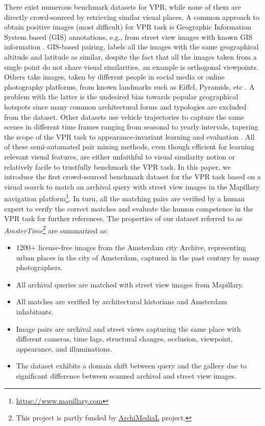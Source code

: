 \documentclass[a4paper,conference]{IEEEtran}
\begin{document}
There exist numerous benchmark datasets for VPR, while none of them are directly crowd-sourced by retrieving similar visual places. A common approach to obtain positive images (most difficult) for VPR task is Geographic Information System based (GIS) annotations, e.g., from street view images with known GIS information \cite{arandjelovic2016netvlad}. GIS-based pairing, labels all the images with the same geographical altitude and latitude as similar, despite the fact that all the images taken from a single point do not share visual similarities, an example is orthogonal viewpoints. Others take images, taken by different people in social media or online photography platforms, from known landmarks such as Eiffel, Pyramids, etc \cite{gordo2016deep,weyand2020google}. A problem with the latter is the undesired bias towards popular geographical hotspots since many common architectural forms and typologies are excluded from the dataset. Other datasets use vehicle trajectories to capture the same scenes in different time frames ranging from seasonal to yearly intervals, tapering the scope of the VPR task to appearance-invariant learning and evaluation \cite{olid2018single,Chen2017}.  All of these semi-automated pair mining methods, even though efficient for learning relevant visual features, are either unfaithful to visual similarity notion or relatively facile to trustfully benchmark the VPR task.  In this paper, we introduce the first crowd-sourced benchmark dataset for the VPR task based on a visual search to match an archival query with street view images in the Mapillary navigation platform\footnote{\href{https://www.mapillary.com}{https://www.mapillary.com}}. In turn, all the matching pairs are verified by a human expert to verify the correct matches and evaluate the human competence in the VPR task for further references. The properties of our dataset referred to as \textit{AmsterTime}\footnote{This project is partly funded by \href{http://archimedial.eu/}{ArchiMediaL} project.} are summarized as:
 
\begin{itemize}
    \item 1200+ license-free images from the Amsterdam city Archive, representing urban places in the city of Amsterdam, captured in the past century by many photographers. 
    \item All archival queries are matched with street view images from Mapillary.
    \item All matches are verified by architectural historians and Amsterdam inhabitants.
    \item Image pairs are archival and street views capturing the same place with different cameras, time lags, structural changes, occlusion, viewpoint, appearance, and illuminations.
    \item The dataset exhibits a domain shift between query and the gallery due to significant difference between scanned archival and street view images.  
\end{itemize}
\end{document}
